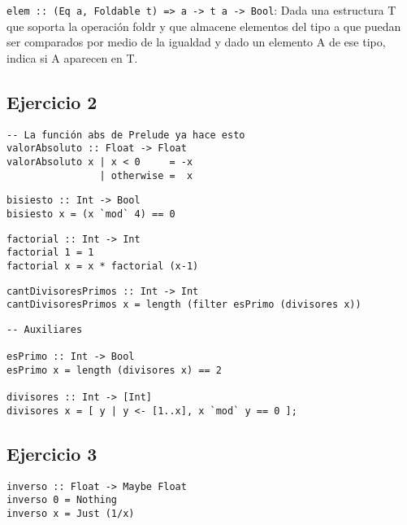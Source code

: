 \vspace*{5mm}
\texttt{elem :: (Eq a, Foldable t) => a -> t a -> Bool}: Dada una estructura T que soporta la operación foldr y que almacene elementos del tipo a que puedan ser comparados por medio de la igualdad y dado un elemento A de ese tipo, indica si A aparecen en T.

\subsection{Ejercicio 2}
\begin{centrado}
\begin{verbatim}
-- La función abs de Prelude ya hace esto
valorAbsoluto :: Float -> Float
valorAbsoluto x | x < 0     = -x
                | otherwise =  x
\end{verbatim}
\end{centrado}
\begin{centrado}
	\begin{verbatim}
bisiesto :: Int -> Bool
bisiesto x = (x `mod` 4) == 0
	\end{verbatim}
\end{centrado}
\begin{centrado}
	\begin{verbatim}
factorial :: Int -> Int
factorial 1 = 1
factorial x = x * factorial (x-1)
	\end{verbatim}
\end{centrado}
\begin{centrado}
	\begin{verbatim}
cantDivisoresPrimos :: Int -> Int
cantDivisoresPrimos x = length (filter esPrimo (divisores x))
	\end{verbatim}
\end{centrado}

\begin{centrado}
	\begin{verbatim}
-- Auxiliares 

esPrimo :: Int -> Bool
esPrimo x = length (divisores x) == 2

divisores :: Int -> [Int]
divisores x = [ y | y <- [1..x], x `mod` y == 0 ];
	\end{verbatim}
\end{centrado}

\subsection{Ejercicio 3}
\begin{centrado}
\begin{verbatim}
inverso :: Float -> Maybe Float
inverso 0 = Nothing
inverso x = Just (1/x)
\end{verbatim}
\end{centrado}

